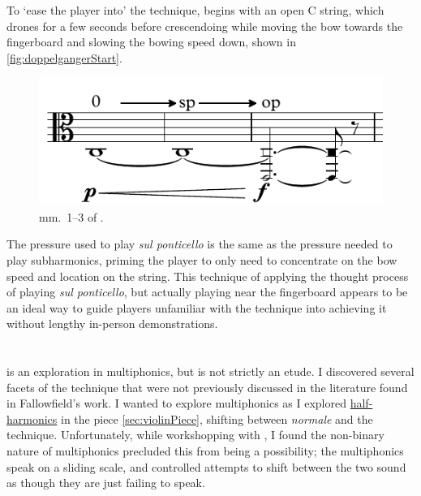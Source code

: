 To `ease the player into' the technique, \violaPiece\space begins with an open C string, which drones for a few seconds before crescendoing while moving the bow towards the fingerboard and slowing the bowing speed down, shown in \autoref{fig:doppelgangerStart}.
\begin{figure}
  \centering
  \includegraphics{./resources/doppelgangerStart.pdf}
  \caption{mm.\ 1--3 of \violaPiece.}\label{fig:doppelgangerStart}
\end{figure}
The pressure used to play \emph{sul ponticello} is the same as the pressure needed to play subharmonics, priming the player to only need to concentrate on the bow speed and location on the string.\autocite[]{appleseedFeedbackSightreadingSession2019}
This technique of applying the thought process of playing \emph{sul ponticello}, but actually playing near the fingerboard appears to be an ideal way to guide players unfamiliar with the technique into achieving it without lengthy in-person demonstrations.\autocites[]{appleseedFeedbackSightreadingSession2019}{bloggsFeedbackContrabassSession2019}

\section{\celloPiece}\label{sec:celloPiece}

\hyperref[app:celloPiece Score]{\celloPiece} is an exploration in multiphonics, but is not strictly an etude.
I discovered several facets of the technique that were not previously discussed in the literature found in Fallowfield's work.\autocite[]{fallowfieldCelloMap}
I wanted to explore multiphonics as I explored \hyperref[sec:half-harmonics]{half-harmonics} in the piece \autoref{sec:violinPiece}, shifting between \emph{normale} and the technique.
Unfortunately, while workshopping with \celloParticipant, I found the non-binary nature of multiphonics precluded this from being a possibility; the multiphonics speak on a sliding scale, and controlled attempts to shift between the two sound as though they are just failing to speak.\autocite[]{smithFeedbackCelloSightreading2019}


